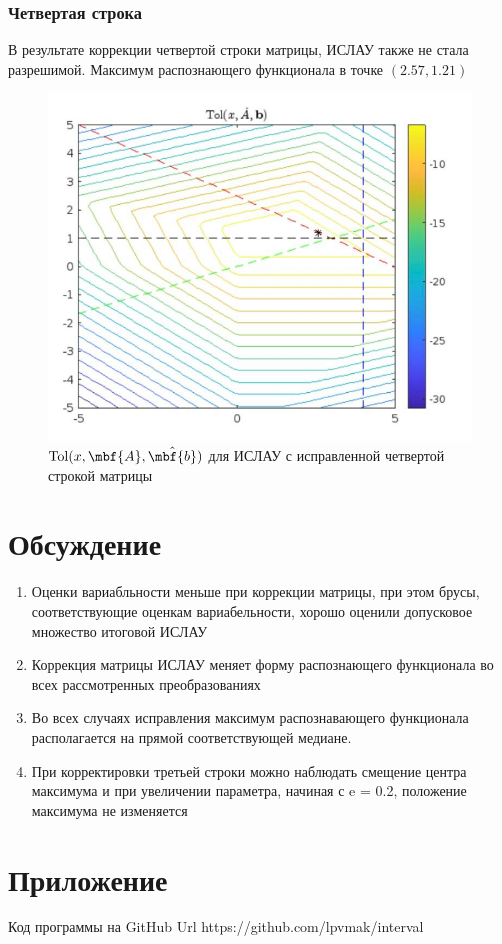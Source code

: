 \documentclass[12pt,a4paper]{article}
\begin{document}
        \subsubsection{Четвертая строка}
            В результате коррекции четвертой строки матрицы, ИСЛАУ также не стала разрешимой. Максимум распознающего функционала в точке $(2.57, 1.21)$ 
            \begin{figure}[H]
                \centering
                \includegraphics[width=16cm]{tol_fourth.png}
                \caption{$\mathrm{Tol}(x,\mbf{A}, \hat{\mbf{b}})$ для ИСЛАУ с исправленной четвертой строкой матрицы}
                \label{fig:aiverve}
            \end{figure}
        
    \section{Обсуждение}
        \begin{enumerate}
            \item Оценки вариабльности меньше при коррекции матрицы, при этом брусы, соответствующие оценкам вариабельности, хорошо оценили допусковое множество
итоговой ИСЛАУ
            \item Коррекция матрицы ИСЛАУ меняет форму распознающего функционала во
всех рассмотренных преобразованиях

            \item Во всех случаях исправления максимум распознавающего функционала располагается на прямой соответствующей медиане.
            
            \item При корректировки третьей строки можно наблюдать смещение центра максимума и при увеличении параметра, начиная с e = 0.2, положение максимума не
изменяется
            
            
        \end{enumerate}

    \section{Приложение}
        Код программы на GitHub Url https://github.com/lpvmak/interval
        
\end{document}
